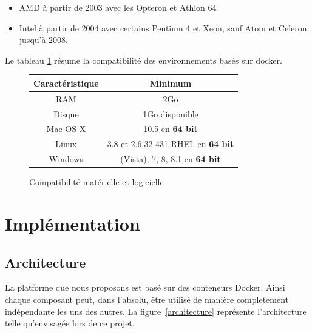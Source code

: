 \documentclass[a4paper,11pt]{report}
\begin{document}
\begin{itemize}
  \item AMD à partir de 2003 avec les Opteron et Athlon 64
  \item Intel à partir de 2004 avec certains Pentium 4 et Xeon, sauf Atom et Celeron jusqu'à 2008.
\end{itemize}

Le tableau \ref{compat} résume la compatibilité des environnements basés sur docker.

   \begin{figure}[h!]
\begin{center}
   \begin{tabular}{| c | c |}
     \hline
     Caractéristique & Minimum \\ \hline
     RAM & 2Go \\ \hline
     Disque & 1Go disponible \\ \hline
     Mac OS X & 10.5 en \textbf{64 bit} \\ \hline
     Linux & 3.8 et 2.6.32-431 RHEL en \textbf{64 bit} \\ \hline
     Windows & (Vista), 7, 8, 8.1 en \textbf{64 bit} \\
     \hline
   \end{tabular}
   \end{center}
   \caption{Compatibilité matérielle et logicielle}
   \label{compat}
  
\end{figure}

\chapter{Implémentation}

\section{Architecture}

La platforme que nous proposons est basé sur des conteneurs Docker. Ainsi chaque composant peut, dans l'absolu, être utilisé de manière
completement indépendante les uns des autres. La figure~\ref{architecture} représente l'architecture telle qu'envisagée lors de ce projet.
\end{document}
